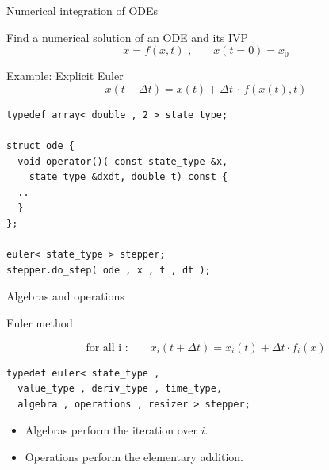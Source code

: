 \documentclass{beamer}
\newcommand{\rem}[1]{}
\newcommand{\heading}[1]{\centerline{\Large #1} \vspace{0.5em}}
\begin{document}
\begin{frame}[fragile]
  
 \heading{Numerical integration of ODEs}
  
\vspace{4ex}
    Find a numerical solution of an ODE and its IVP
    \[ \dot{x} = f(x,t) \,\,\textrm{,} \quad \quad x(t=0) = x_0\]

   \vspace{2ex}

   Example: Explicit Euler
   \[ x(t + \Delta t ) = x(t) + \Delta t \,\cdot\, f(x(t),t) \]

   \vspace{2ex}

   \begin{lstlisting}[basicstyle=\scriptsize\ttfamily]
typedef array< double , 2 > state_type;

struct ode {
  void operator()( const state_type &x,
    state_type &dxdt, double t) const {
  ..
  }
};

euler< state_type > stepper;
stepper.do_step( ode , x , t , dt );
\end{lstlisting}


   \vspace{2ex}
\rem{
   General scheme of order $s$
    \[ x(t) \,\, \mapsto \,\, x(t+\Delta t) \quad \quad \text{, or}\]
    \[x(t + \Delta t) = \mathcal{F}_t x(t) + \mathcal{O}(\Delta t^{s+1})\] }

\end{frame}





\begin{frame}[fragile]

 \heading{Algebras and operations}

 \vspace{2ex}

Euler method

$$\text{for all i :}  \quad \quad x_i(t+\Delta t) = x_i(t) + \Delta t \cdot f_i(x)$$

\vspace{2ex}

\begin{lstlisting}
typedef euler< state_type ,
  value_type , deriv_type , time_type,
  algebra , operations , resizer > stepper; 
\end{lstlisting}


\begin{itemize}
\item Algebras perform the iteration over $i$.
\item Operations perform the elementary addition.
\end{itemize}


\end{frame}
\end{document}

